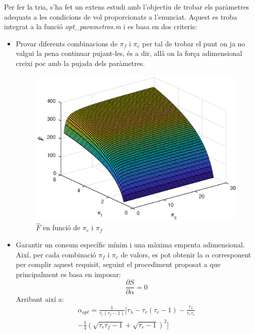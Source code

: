 Per fer la tria,  s'ha fet un extens estudi amb l'objectiu de trobar els paràmetres adequats a les condicions de vol proporcionats a l'enunciat. Aquest es troba integrat a la funció \textit{opt\_parametros.m} i es basa en dos criteris:
\begin{itemize}
\item Provar diferents combinacions de $\pi_f$ i $\pi_c$ per tal de trobar el punt on ja no valgui la pena continuar pujant-les, és a dir, allà on la força adimensional creixi poc amb la pujada dels paràmetres.
\begin{figure}[H]
	\centering
	\includegraphics[scale=0.6]{./pics/F_pc_pf}
	\caption{\(\hat{F}\) en funció de $\pi_c$ i $\pi_f$}
\end{figure}
\item Garantir un consum específic mínim i una màxima empenta adimensional. Així, per cada combinació  $\pi_f$ i $\pi_c$ de valors, es pot obtenir la $\alpha$ corresponent per complir aquest requisit, seguint el procediment proposat a \cite[5-10]{mattingly} que principalment es basa en imposar:
\begin{equation*}
	\frac{\partial S}{\partial \alpha} = 0 
\end{equation*}
Arribant així a:
\begin{multline}
	\alpha_{opt} = \frac{1}{\tau_r(\tau_f-1)}\bigg[\tau_{\lambda}-\tau_r(\tau_c-1)-\frac{\tau_{\lambda}}{\tau_r\tau_c} \\ -\frac{1}{4}(\sqrt{\tau_r\tau_f-1} + \sqrt{\tau_r-1})^2\bigg]
\end{multline}
\begin{figure}[H]
	\centering

\end{figure}
\end{itemize}
